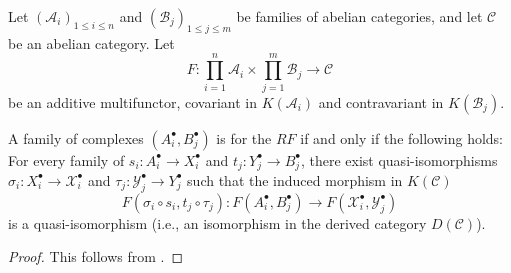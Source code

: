 \begin{proposition} \label{proposition:complex_in_an_abelian_category_is_deployed_in_homotopy_category_for_an_additive_functor_iff_fun_preserves_terminal_nature_of_quasi_isomorphisms}
    Let $(\mathcal{A}_i)_{1 \le i \le n}$ and $(\mathcal{B}_j)_{1 \le j \le m}$ be families of abelian categories, and let $\mathcal{C}$ be an abelian category. Let 
    \[ F: \prod_{i=1}^n \mathcal{A}_i \times \prod_{j=1}^m \mathcal{B}_j \to \mathcal{C} \] 
    be an additive multifunctor, covariant in $K(\mathcal{A}_i)$ and contravariant in $K(\mathcal{B}_j)$. 
    
    A family of complexes $(A_i^\bullet, B_j^\bullet)$ is  for the  $RF$ if and only if the following holds: 
    For every family of  $s_i: A_i^\bullet \to X_i^\bullet$ and $t_j: Y_j^\bullet \to B_j^\bullet$, there exist quasi-isomorphisms $\sigma_i: X_i^\bullet \to \mathcal{X}_i^\bullet$ and $\tau_j: \mathcal{Y}_j^\bullet \to Y_j^\bullet$ such that the induced morphism in $K(\mathcal{C})$
    \[ F(\sigma_i \circ s_i, t_j \circ \tau_j): F(A_i^\bullet, B_j^\bullet) \to F(\mathcal{X}_i^\bullet, \mathcal{Y}_j^\bullet) \]
    is a quasi-isomorphism (i.e., an isomorphism in the derived category $D(\mathcal{C})$).
\end{proposition}
\begin{proof}
    This follows from .
\end{proof}